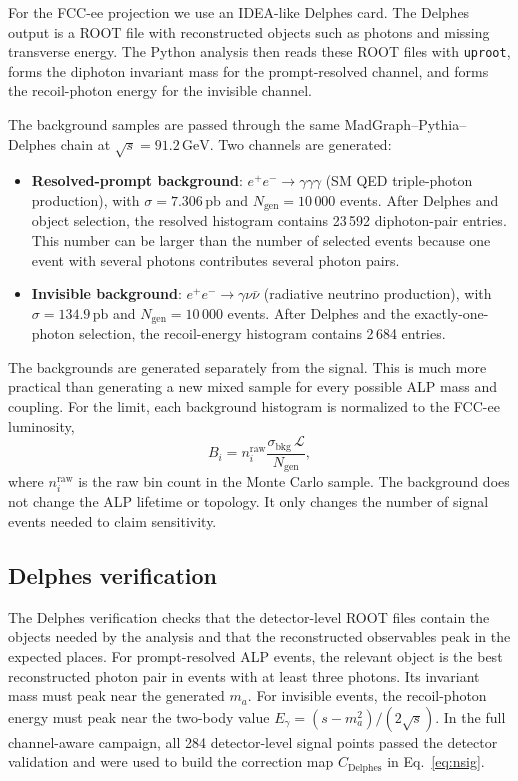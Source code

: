 \documentclass[12pt,a4paper]{article}
\begin{document}
For the FCC-ee projection we use an IDEA-like Delphes card. The Delphes output
is a ROOT file with reconstructed objects such as photons and missing
transverse energy. The Python analysis then reads these ROOT files with
\texttt{uproot}, forms the diphoton invariant mass for the prompt-resolved
channel, and forms the recoil-photon energy for the invisible channel.

The background samples are passed through the same MadGraph--Pythia--Delphes
chain at $\sqrt{s}=91.2\,\text{GeV}$. Two channels are generated:
\begin{itemize}
    \item \textbf{Resolved-prompt background}: $e^+e^-\to\gamma\gamma\gamma$
    (SM QED triple-photon production),
    with $\sigma = 7.306\,\text{pb}$ and $N_\mathrm{gen} = 10\,000$ events.
    After Delphes and object selection, the resolved histogram contains
    23\,592 diphoton-pair entries. This number can be larger than the number of
    selected events because one event with several photons contributes several
    photon pairs.

    \item \textbf{Invisible background}: $e^+e^-\to\gamma\nu\bar{\nu}$
    (radiative neutrino production),
    with $\sigma = 134.9\,\text{pb}$ and $N_\mathrm{gen} = 10\,000$ events.
    After Delphes and the exactly-one-photon selection, the recoil-energy
    histogram contains 2\,684 entries.
\end{itemize}
The backgrounds are generated separately from the signal. This is much more
practical than generating a new mixed sample for every possible ALP mass and
coupling. For the limit, each background histogram is normalized to the FCC-ee
luminosity,
\begin{equation}
    B_i
    =
    n_i^\mathrm{raw}
    \frac{\sigma_\mathrm{bkg}\,\mathcal{L}}{N_\mathrm{gen}},
    \label{eq:bkg_norm}
\end{equation}
where $n_i^\mathrm{raw}$ is the raw bin count in the Monte Carlo sample. The
background does not change the ALP lifetime or topology. It only changes the
number of signal events needed to claim sensitivity.

\subsection{Delphes verification}

The Delphes verification checks that the detector-level ROOT files contain the
objects needed by the analysis and that the reconstructed observables peak in
the expected places. For prompt-resolved ALP events, the relevant object is the
best reconstructed photon pair in events with at least three photons. Its
invariant mass must peak near the generated $m_{a}$. For invisible events, the
recoil-photon energy must peak near the two-body value
$E_\gamma=(s-m_{a}^{2})/(2\sqrt{s})$. In the full channel-aware campaign, all
284 detector-level signal points passed the detector validation and were used
to build the correction map $C_\mathrm{Delphes}$ in Eq.~\eqref{eq:nsig}.
\end{document}
